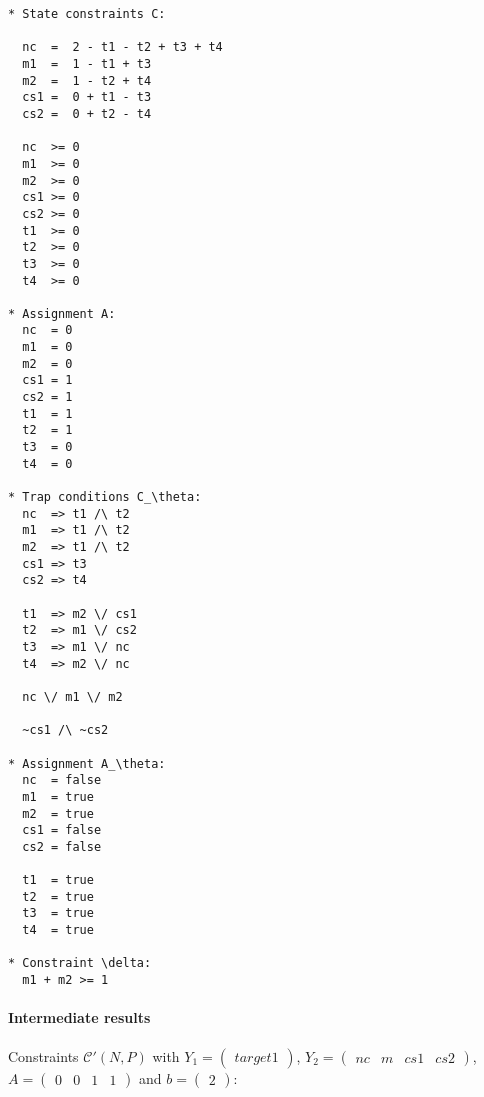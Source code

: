 \documentclass{article}
\begin{document}
\begin{verbatim}
* State constraints C:

  nc  =  2 - t1 - t2 + t3 + t4
  m1  =  1 - t1 + t3
  m2  =  1 - t2 + t4
  cs1 =  0 + t1 - t3
  cs2 =  0 + t2 - t4

  nc  >= 0
  m1  >= 0
  m2  >= 0
  cs1 >= 0
  cs2 >= 0
  t1  >= 0
  t2  >= 0
  t3  >= 0
  t4  >= 0

* Assignment A:
  nc  = 0
  m1  = 0
  m2  = 0
  cs1 = 1
  cs2 = 1
  t1  = 1
  t2  = 1
  t3  = 0
  t4  = 0

* Trap conditions C_\theta:
  nc  => t1 /\ t2
  m1  => t1 /\ t2
  m2  => t1 /\ t2
  cs1 => t3
  cs2 => t4

  t1  => m2 \/ cs1
  t2  => m1 \/ cs2
  t3  => m1 \/ nc
  t4  => m2 \/ nc

  nc \/ m1 \/ m2

  ~cs1 /\ ~cs2

* Assignment A_\theta:
  nc  = false
  m1  = true
  m2  = true
  cs1 = false
  cs2 = false

  t1  = true
  t2  = true
  t3  = true
  t4  = true

* Constraint \delta:
  m1 + m2 >= 1
\end{verbatim}








































\iffalse

\paragraph{Intermediate results}
Constraints $\mathcal C'(N, P)$ with
$Y_1 = \begin{pmatrix}target1 \end{pmatrix}$,
$Y_2 =\begin{pmatrix}nc & m & cs1 & cs2\end{pmatrix}$,
$A =\begin{pmatrix}0 & 0 & 1 & 1 \end{pmatrix}$ and
$b =\begin{pmatrix}2 \end{pmatrix}$:
\end{document}
